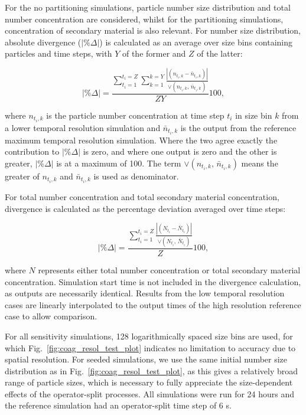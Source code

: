 \documentclass[gmd, manuscript]{copernicus}
\begin{document}
For the no partitioning simulations, particle number size distribution and total number concentration are considered, whilst for the partitioning simulations, concentration of secondary material is also relevant. For number size distribution, absolute divergence ($|\% \Delta|$) is calculated as an average over size bins containing particles and time steps, with $Y$ of the former and $Z$ of the latter:

\begin{equation} \label{eq:tr_diverg_nsd}
|\% \Delta| = \frac{\sum_{t_i=1}^{t_i=Z} \sum_{k=1}^{k=Y}\frac{|(n_{t_i,k}-\bar{n}_{t_i,k})|}{\lor(n_{t_i,k},\, \bar{n}_{t_i,k})}}{ZY}100,
\end{equation}

where $n_{t_i,k}$ is the particle number concentration at time step $t_i$ in size bin $k$ from a lower temporal resolution simulation and $\bar{n}_{t_i,k}$ is the output from the reference maximum temporal resolution simulation.  Where the two agree exactly the contribution to $|\% \Delta|$ is zero, and where one output is zero and the other is greater, $|\% \Delta|$ is at a maximum of 100.  The term $\lor(n_{t_i,k},\, \bar{n}_{t_i,k})$ means the greater of $n_{t_i,k}$ and $\bar{n}_{t_i,k}$ is used as denominator.  

For total number concentration and total secondary material concentration, divergence is calculated as the percentage deviation averaged over time steps:

\begin{equation} \label{eq:tr_diverg}
|\% \Delta| = \frac{\sum_{t_i=1}^{t_i=Z} \frac{|(N_{t_i}-\bar{N}_{t_i})|}{\lor(N_{t_i},\, \bar{N}_{t_i})}}{Z}100,
\end{equation}

where $N$ represents either total number concentration or total secondary material concentration.  Simulation start time is not included in the divergence calculation, as outputs are necessarily identical.  Results from the low temporal resolution cases are linearly interpolated to the output times of the high resolution reference case to allow comparison.

For all sensitivity simulations, 128 logarithmically spaced size bins are used, for which Fig.~\ref{fig:coag_resol_test_plot} indicates no limitation to accuracy due to spatial resolution.  For seeded simulations, we use the same initial number size distribution as in Fig.~\ref{fig:coag_resol_test_plot}, as this gives a relatively broad range of particle sizes, which is necessary to fully appreciate the size-dependent effects of the operator-split processes.  All simulations were run for 24 hours and the reference simulation had an operator-split time step of 6 s.
\end{document}
